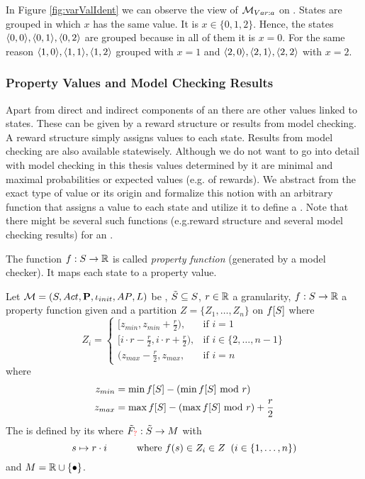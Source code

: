 \documentclass[preview]{standalone}
\begin{document}
In Figure \ref{fig:varValIdent} we can observe the view of ${{{{{\mathcal{M}}}}_{{Var:{a}}}}}$ on \chgph. States are grouped in which $x$ has the same value. It is $x \in \{0, 1, 2\}$. Hence, the states ${\langle0,0\rangle}, {\langle0,1\rangle},{\langle0,2\rangle}$ are grouped because in all of them it is $x=0$. For the same reason ${\langle1,0\rangle}, {\langle1,1\rangle},{\langle1,2\rangle}$ grouped with $x=1$ and ${\langle2,0\rangle}, {\langle2,1\rangle},{\langle2,2\rangle}$ with $x=2$.
\subsubsection{Property Values and Model Checking Results}
Apart from direct and indirect components of an \mdpN there are other values linked to states. These can be given by a reward structure or results from model checking. A reward structure simply assigns values to each state. Results from model checking are also available statewisely. Although we do not want to go into detail with model checking in this thesis values determined by it are minimal and maximal probabilities or expected values (e.g. of rewards). We abstract from the exact type of value or its origin and formalize this notion with an arbitrary function that assigns a value to each state and utilize it to define a \viewN. Note that there might be several such functions (e.g.reward structure and several model checking results) for an \chgphN.

\begin{definition}
	The function ${f} : {S} \to {\mathbb{R}}$ is called \emph{property function} (generated by a model checker). It maps each state to a property value.
\end{definition}

\begin{definition}
	Let ${{{\mathcal{M}}}} = {{({S}, {Act}, {\textbf{P}}, {\iota_{init}}, {AP}, {L})}}$ be \achgphN, ${\tilde{{S}}} \subseteq {S}$, $r \in {\mathbb{R}}$ a granularity, ${f} : {S} \to {\mathbb{R}}$ a property function given and a partition $Z = \{Z_1, \dots, Z_n\}$ on ${f}[{S}]$ where 
	\[
		Z_i = 
		\begin{cases}
			[z_{min}, z_{min} + \frac{r}{2}), &\text{if } i=1 \\
			[i \cdot r -  \frac{r}{2}, i \cdot r +  \frac{r}{2}), &\text{if } i\in\{2,\dots, n-1\} \\
			(z_{max}-\frac{r}{2}, z_{max}, &\text{if } i = n
		\end{cases}
	\]
	where 
\begin{align*}
	z_{min} &= \min{f}[{S}] - (\min{f}[{S}] \text{ mod } r) \\
	z_{max} &= \max{f}[{S}] - (\max{f}[{S}] \text{ mod } r) + \frac{r}{2}
\end{align*}	
	The \viewN \viewprop is defined by its \grpfctN \gfctprop where ${{\tilde{F}_{{{\color{red}?}}}}} : {\tilde{{S}}} \to {\ensuremath{{M}}}$ with
	\[
	{s} \mapsto r \cdot i \quad\quad\quad \text{where } {f}({s}) \in Z_i \in Z \;\; (i \in \{1, \dots, n\}) 
	\]
	and $\imggrp = \realnums \cup \remset$.
\end{definition}
\end{document}
